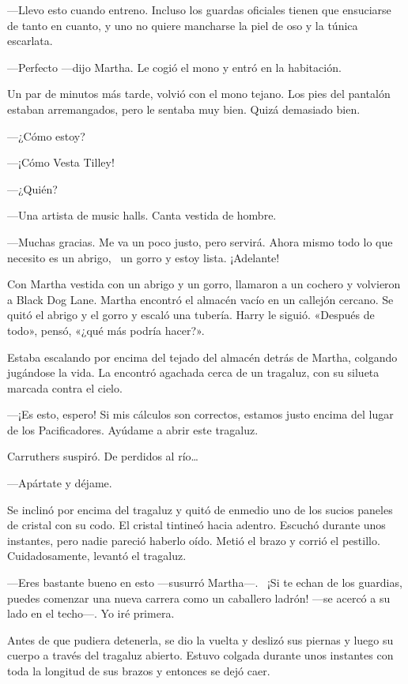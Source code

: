 ---Llevo esto cuando entreno. Incluso los guardas oficiales tienen que
ensuciarse de tanto en cuanto, y uno no quiere mancharse la piel de oso
y la túnica escarlata.

---Perfecto ---dijo Martha. Le cogió el mono y entró en la habitación.

Un par de minutos más tarde, volvió con el mono tejano. Los pies del
pantalón estaban arremangados, pero le sentaba muy bien. Quizá demasiado
bien.

---¿Cómo estoy?

---¡Cómo Vesta Tilley!

---¿Quién?

---Una artista de music halls. Canta vestida de hombre.

---Muchas gracias. Me va un poco justo, pero servirá. Ahora mismo todo
lo que necesito es un abrigo, ~un gorro y estoy lista. ¡Adelante!

Con Martha vestida con un abrigo y un gorro, llamaron a un cochero y
volvieron a Black Dog Lane. Martha encontró el almacén vacío en un
callejón cercano. Se quitó el abrigo y el gorro y escaló una tubería.
Harry le siguió. «Después de todo», pensó, «¿qué más podría hacer?».

Estaba escalando por encima del tejado del almacén detrás de Martha,
colgando jugándose la vida. La encontró agachada cerca de un tragaluz,
con su silueta marcada contra el cielo.

---¡Es esto, espero! Si mis cálculos son correctos, estamos justo
encima del lugar de los Pacificadores. Ayúdame a abrir este tragaluz.

Carruthers suspiró. De perdidos al río\ldots{}

---Apártate y déjame.

Se inclinó por encima del tragaluz y quitó de enmedio uno de los sucios
paneles de cristal con su codo. El cristal tintineó hacia adentro.
Escuchó durante unos instantes, pero nadie pareció haberlo oído. Metió
el brazo y corrió el pestillo. Cuidadosamente, levantó el tragaluz.

---Eres bastante bueno en esto ---susurró Martha---. ~¡Si te echan de
los guardias, puedes comenzar una nueva carrera como un caballero
ladrón! ---se acercó a su lado en el techo---. Yo iré primera.

Antes de que pudiera detenerla, se dio la vuelta y deslizó sus piernas y
luego su cuerpo a través del tragaluz abierto. Estuvo colgada durante
unos instantes con toda la longitud de sus brazos y entonces se dejó
caer.

